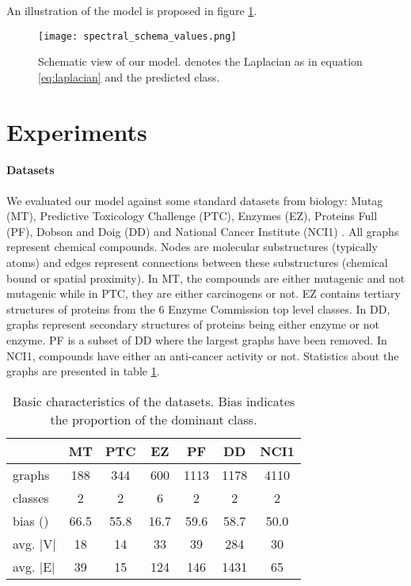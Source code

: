 \documentclass{article}
\begin{document}
An illustration of the model is proposed in figure \ref{fig:model}.

\begin{figure}
    \centering
    \texttt{[image: spectral\_schema\_values.png]}
    \caption{Schematic view of our model.  denotes the Laplacian as in equation \ref{eq:laplacian} and  the predicted class.}
    \label{fig:model}
\end{figure}

\section{Experiments}
\label{sec:experiments}

\paragraph{Datasets}
We evaluated our model against some standard datasets from biology: Mutag (MT), Predictive Toxicology Challenge (PTC), Enzymes (EZ), Proteins Full (PF), Dobson and Doig (DD) and National Cancer Institute (NCI1) \citep{KKMMN2016}. All graphs represent chemical compounds. Nodes are molecular substructures (typically atoms) and edges represent connections between these substructures (chemical bound or spatial proximity). In MT, the compounds are either mutagenic and not mutagenic while in PTC, they are either carcinogens or not. EZ contains tertiary structures of proteins from the 6 Enzyme Commission top level classes. In DD, graphs represent secondary structures of proteins being either enzyme or not enzyme. PF is a subset of DD where the largest graphs have been removed. In NCI1, compounds have either an anti-cancer activity or not. Statistics about the graphs are presented in table \ref{tab:datasets}.

\begin{table}
    \centering
    \renewcommand{\arraystretch}{1.2}
    \begin{tabular}[t]{l|cccccc}
    
                          & MT    & PTC   & EZ    & PF    & DD    & NCI1  \\
        \hline
         graphs       & 188   & 344   & 600   & 1113  & 1178  & 4110  \\
         classes      & 2     & 2     & 6     & 2     & 2     & 2     \\
        bias ()       & 66.5  & 55.8  & 16.7  & 59.6  & 58.7  & 50.0  \\
        avg. |V|          & 18    & 14    & 33    & 39    & 284   & 30  \\
        avg. |E|          & 39    & 15    & 124   & 146   & 1431  & 65  \\
    
    \end{tabular}
    \vspace{0.5cm}
    \caption{Basic characteristics of the datasets. Bias indicates the proportion of the dominant class.}
    \label{tab:datasets}
\end{table}
\end{document}
